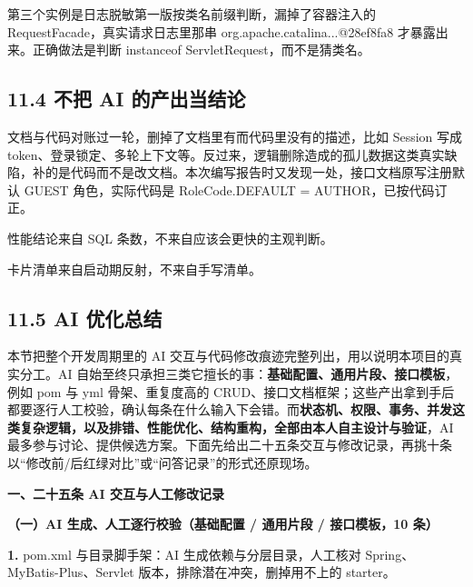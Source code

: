 \documentclass[zihao=-4,UTF8,openany]{ctexart}
\renewcommand{\_}{\textunderscore\allowbreak}
\begin{document}
第三个实例是日志脱敏第一版按类名前缀判断，漏掉了容器注入的 RequestFacade，真实请求日志里那串 org.apache.catalina...@28ef8fa8 才暴露出来。正确做法是判断 instanceof ServletRequest，而不是猜类名。

\subsection*{\texorpdfstring{\textbf{11.4 不把 AI 的产出当结论}}{11.4 不把 AI 的产出当结论}}\label{ux4e0dux628a-ai-ux7684ux4ea7ux51faux5f53ux7ed3ux8bba}

文档与代码对账过一轮，删掉了文档里有而代码里没有的描述，比如 Session 写成 token、登录锁定、多轮上下文等。反过来，逻辑删除造成的孤儿数据这类真实缺陷，补的是代码而不是改文档。本次编写报告时又发现一处，接口文档原写注册默认 GUEST 角色，实际代码是 RoleCode.DEFAULT = AUTHOR，已按代码订正。

性能结论来自 SQL 条数，不来自应该会更快的主观判断。

卡片清单来自启动期反射，不来自手写清单。

\subsection*{\texorpdfstring{\textbf{11.5 AI 优化总结}}{11.5 AI 优化总结}}\label{ai-ux4f18ux5316ux603bux7ed3}

本节把整个开发周期里的 AI 交互与代码修改痕迹完整列出，用以说明本项目的真实分工。AI 自始至终只承担三类它擅长的事：\textbf{基础配置、通用片段、接口模板}，例如 pom 与 yml 骨架、重复度高的 CRUD、接口文档框架；这些产出拿到手后都要逐行人工校验，确认每条在什么输入下会错。而\textbf{状态机、权限、事务、并发这类复杂逻辑，以及排错、性能优化、结构重构，全部由本人自主设计与验证}，AI 最多参与讨论、提供候选方案。下面先给出二十五条交互与修改记录，再挑十条以“修改前/后红绿对比”或“问答记录”的形式还原现场。


\noindent\textbf{一、二十五条 AI 交互与人工修改记录}

\noindent\textbf{（一）AI 生成、人工逐行校验（基础配置 / 通用片段 / 接口模板，10 条）}

\noindent\textbf{1.} pom.xml 与目录脚手架：AI 生成依赖与分层目录，人工核对 Spring、MyBatis-Plus、Servlet 版本，排除潜在冲突，删掉用不上的 starter。
\end{document}
